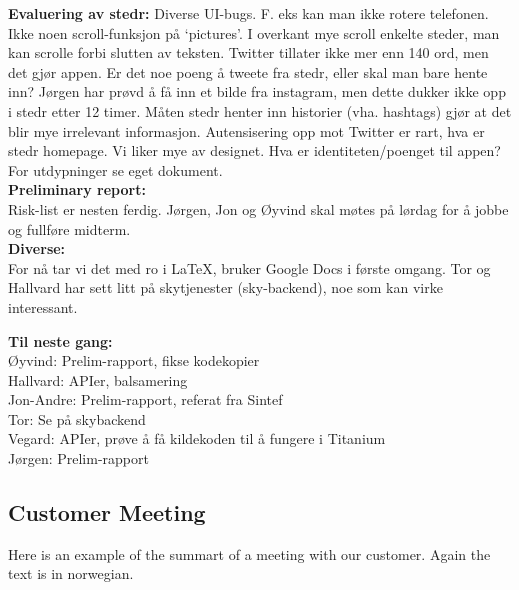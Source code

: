 \textbf{Evaluering av stedr:}
Diverse UI-bugs. F. eks kan man ikke rotere telefonen. Ikke noen scroll-funksjon på ‘pictures’. I overkant mye scroll enkelte steder, man kan scrolle forbi slutten av teksten. Twitter tillater ikke mer enn 140 ord, men det gjør appen. Er det noe poeng å tweete fra stedr, eller skal man bare hente inn? Jørgen har prøvd å få inn et bilde fra instagram, men dette dukker ikke opp i stedr etter 12 timer.
Måten stedr henter inn historier (vha. hashtags) gjør at det blir mye irrelevant informasjon. Autensisering opp mot Twitter er rart, hva er stedr homepage. Vi liker mye av designet. Hva er identiteten/poenget til appen? For utdypninger se eget dokument.\\

\textbf{Preliminary report:}\\
Risk-list er nesten ferdig. Jørgen, Jon og Øyvind skal møtes på lørdag for å jobbe og fullføre midterm.\\


\textbf{Diverse:}\\
For nå tar vi det med ro i LaTeX, bruker Google Docs i første omgang. Tor og Hallvard har sett litt på skytjenester (sky-backend), noe som kan virke interessant. \\


\textbf{Til neste gang:}\\
Øyvind: Prelim-rapport, fikse kodekopier\\
Hallvard: APIer, balsamering\\
Jon-Andre: Prelim-rapport, referat fra Sintef\\
Tor: Se på skybackend\\
Vegard: APIer, prøve å få kildekoden til å fungere i Titanium\\
Jørgen: Prelim-rapport\\

\clearpage


%

\subsection{Customer Meeting}
Here is an example of the summart of a meeting with our customer. Again the text is in norwegian.
\clearpage
{}

